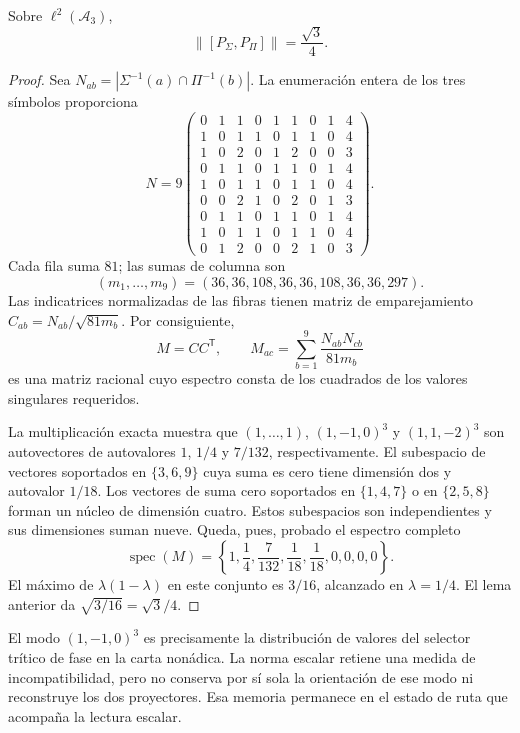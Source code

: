 \begin{proposition}
Sobre \(\ell^2(\mathcal A_3)\),
\begin{equation}
 \|[P_\Sigma,P_\Pi]\|=\frac{\sqrt3}{4}.
 \label{eq:el-prefactor}
\end{equation}
\end{proposition}
\begin{proof}
Sea \(N_{ab}=|\Sigma^{-1}(a)\cap\Pi^{-1}(b)|\). La enumeración entera
de los tres símbolos proporciona
\[
 N=9\begin{pmatrix}
 0&1&1&0&1&1&0&1&4\\
 1&0&1&1&0&1&1&0&4\\
 1&0&2&0&1&2&0&0&3\\
 0&1&1&0&1&1&0&1&4\\
 1&0&1&1&0&1&1&0&4\\
 0&0&2&1&0&2&0&1&3\\
 0&1&1&0&1&1&0&1&4\\
 1&0&1&1&0&1&1&0&4\\
 0&1&2&0&0&2&1&0&3
 \end{pmatrix}.
\]
Cada fila suma \(81\); las sumas de columna son
\[
 (m_1,\ldots,m_9)=(36,36,108,36,36,108,36,36,297).
\]
Las indicatrices normalizadas de las fibras tienen matriz de
emparejamiento \(C_{ab}=N_{ab}/\sqrt{81m_b}\). Por consiguiente,
\[
 M=CC^{\mathsf T},\qquad
 M_{ac}=\sum_{b=1}^9\frac{N_{ab}N_{cb}}{81m_b}
\]
es una matriz racional cuyo espectro consta de los cuadrados de los
valores singulares requeridos.

La multiplicación exacta muestra que \((1,\ldots,1)\),
\((1,-1,0)^3\) y \((1,1,-2)^3\) son autovectores de autovalores
\(1\), \(1/4\) y \(7/132\), respectivamente. El subespacio de
vectores soportados en \(\{3,6,9\}\) cuya suma es cero tiene dimensión
dos y autovalor \(1/18\). Los vectores de suma cero soportados en
\(\{1,4,7\}\) o en \(\{2,5,8\}\) forman un núcleo de dimensión
cuatro. Estos subespacios son independientes y sus dimensiones suman
nueve. Queda, pues, probado el espectro completo
\[
 \operatorname{spec}(M)=
 \left\{1,\frac14,\frac7{132},\frac1{18},\frac1{18},0,0,0,0\right\}.
\]
El máximo de \(\lambda(1-\lambda)\) en este conjunto es \(3/16\),
alcanzado en \(\lambda=1/4\). El lema anterior da
\(\sqrt{3/16}=\sqrt3/4\).
\end{proof}

El modo \((1,-1,0)^3\) es precisamente la distribución de valores del
selector trítico de fase en la carta nonádica. La norma escalar retiene
una medida de incompatibilidad, pero no conserva por sí sola la
orientación de ese modo ni reconstruye los dos proyectores. Esa memoria
permanece en el estado de ruta que acompaña la lectura escalar.

